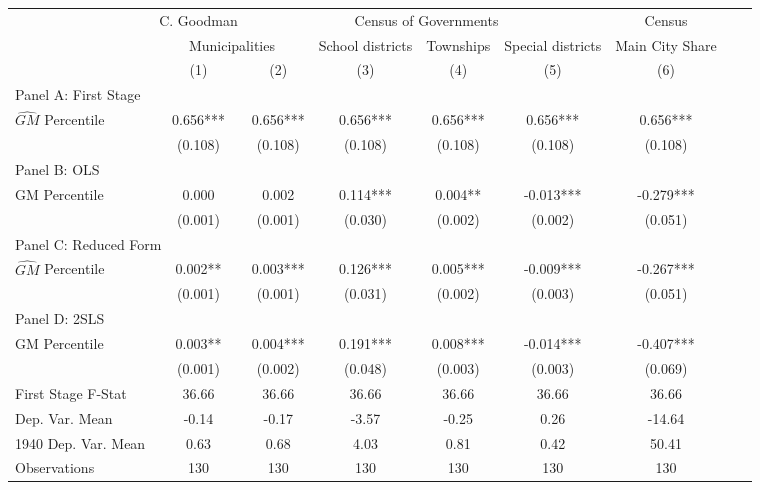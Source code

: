  \begin{tabular}{l*{8}{c}} \toprule
&\multicolumn{1}{c}{C. Goodman}&\multicolumn{4}{c}{Census of Governments}&\multicolumn{1}{c}{Census}\\\cmidrule(lr){2-2}\cmidrule(lr){3-6}\cmidrule(lr){7-7}
&\multicolumn{2}{c}{Municipalities}&\multicolumn{1}{c}{School districts}&\multicolumn{1}{c}{Townships}&\multicolumn{1}{c}{Special districts}&\multicolumn{1}{c}{Main City Share}\\\cmidrule(lr){2-3}\cmidrule(lr){4-6}\cmidrule(lr){7-7}
&\multicolumn{1}{c}{(1)}&\multicolumn{1}{c}{(2)}&\multicolumn{1}{c}{(3)}&\multicolumn{1}{c}{(4)}&\multicolumn{1}{c}{(5)}&\multicolumn{1}{c}{(6)}\\
\cmidrule(lr){1-7}
\multicolumn{6}{l}{Panel A: First Stage}\\
\cmidrule(lr){1-7}
$\widehat{GM}$ Percentile&    0.656***&    0.656***&    0.656***&    0.656***&    0.656***&    0.656***\\
                &  (0.108)   &  (0.108)   &  (0.108)   &  (0.108)   &  (0.108)   &  (0.108)   \\
\cmidrule(lr){1-7}
\multicolumn{6}{l}{Panel B: OLS}\\
\cmidrule(lr){1-7}
GM Percentile   &    0.000   &    0.002   &    0.114***&    0.004** &   -0.013***&   -0.279***\\
                &  (0.001)   &  (0.001)   &  (0.030)   &  (0.002)   &  (0.002)   &  (0.051)   \\
\cmidrule(lr){1-7}
\multicolumn{6}{l}{Panel C: Reduced Form}\\
\cmidrule(lr){1-7}
$\widehat{GM}$ Percentile&    0.002** &    0.003***&    0.126***&    0.005***&   -0.009***&   -0.267***\\
                &  (0.001)   &  (0.001)   &  (0.031)   &  (0.002)   &  (0.003)   &  (0.051)   \\
\cmidrule(lr){1-7}
\multicolumn{6}{l}{Panel D: 2SLS}\\
\cmidrule(lr){1-7}
GM Percentile   &    0.003** &    0.004***&    0.191***&    0.008***&   -0.014***&   -0.407***\\
                &  (0.001)   &  (0.002)   &  (0.048)   &  (0.003)   &  (0.003)   &  (0.069)   \\
\midrule
First Stage F-Stat&    36.66   &    36.66   &    36.66   &    36.66   &    36.66   &    36.66   \\
Dep. Var. Mean  &    -0.14   &    -0.17   &    -3.57   &    -0.25   &     0.26   &   -14.64   \\
1940 Dep. Var. Mean&     0.63   &     0.68   &     4.03   &     0.81   &     0.42   &    50.41   \\
Observations    &      130   &      130   &      130   &      130   &      130   &      130   \\
       \bottomrule \end{tabular}
